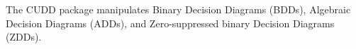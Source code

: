 The CUDD package manipulates Binary Decision Diagrams (BDDs), Algebraic Decision Diagrams (ADDs), and Zero-\/suppressed binary Decision Diagrams (ZDDs). 